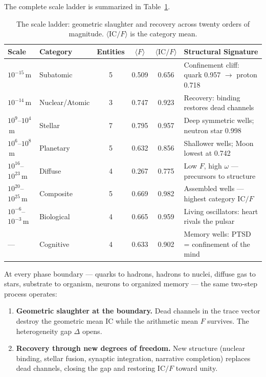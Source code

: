 \documentclass[
  aps,
  prd,
  twocolumn,
  superscriptaddress,
  nofootinbib,
  floatfix
]{revtex4-2}
\newcommand{\IC}{\mathrm{IC}}
\begin{document}
The complete scale ladder is summarized in
Table~\ref{tab:ladder}.

\clearpage
\begin{table}[t]
\caption{\label{tab:ladder}The scale ladder: geometric
slaughter and recovery across twenty orders of magnitude.
$\langle \IC/F \rangle$ is the category mean.}
\begin{ruledtabular}
\begin{tabular}{llcccl}
Scale & Category & Entities & $\langle F \rangle$ &
  $\langle \IC/F \rangle$ & Structural Signature \\
\hline
$10^{-15}$\,m & Subatomic &
  5 & 0.509 & 0.656 &
  Confinement cliff: quark 0.957 $\to$ proton 0.718 \\
$10^{-14}$\,m & Nuclear/Atomic &
  3 & 0.747 & 0.923 &
  Recovery: binding restores dead channels \\
$10^{9}$--$10^{4}$\,m & Stellar &
  7 & 0.795 & 0.957 &
  Deep symmetric wells; neutron star 0.998 \\
$10^{6}$--$10^{8}$\,m & Planetary &
  5 & 0.632 & 0.856 &
  Shallower wells; Moon lowest at 0.742 \\
$10^{16}$--$10^{23}$\,m & Diffuse &
  4 & 0.267 & 0.775 &
  Low $F$, high $\omega$ --- precursors to structure \\
$10^{20}$--$10^{25}$\,m & Composite &
  5 & 0.669 & 0.982 &
  Assembled wells --- highest category $\IC/F$ \\
$10^{-6}$--$10^{-3}$\,m & Biological &
  4 & 0.665 & 0.959 &
  Living oscillators: heart rivals the pulsar \\
--- & Cognitive &
  4 & 0.633 & 0.902 &
  Memory wells: PTSD = confinement of the mind \\
\end{tabular}
\end{ruledtabular}
\end{table}

At every phase boundary --- quarks to hadrons, hadrons to
nuclei, diffuse gas to stars, substrate to organism, neurons
to organized memory --- the same two-step process operates:

\begin{enumerate}
\item \textbf{Geometric slaughter at the boundary.}
  Dead channels in the trace vector destroy the geometric
  mean $\IC$ while the arithmetic mean $F$ survives.  The
  heterogeneity gap $\Delta$ opens.
\item \textbf{Recovery through new degrees of freedom.}
  New structure (nuclear binding, stellar fusion, synaptic
  integration, narrative completion) replaces dead channels,
  closing the gap and restoring $\IC/F$ toward unity.
\end{enumerate}
\end{document}
